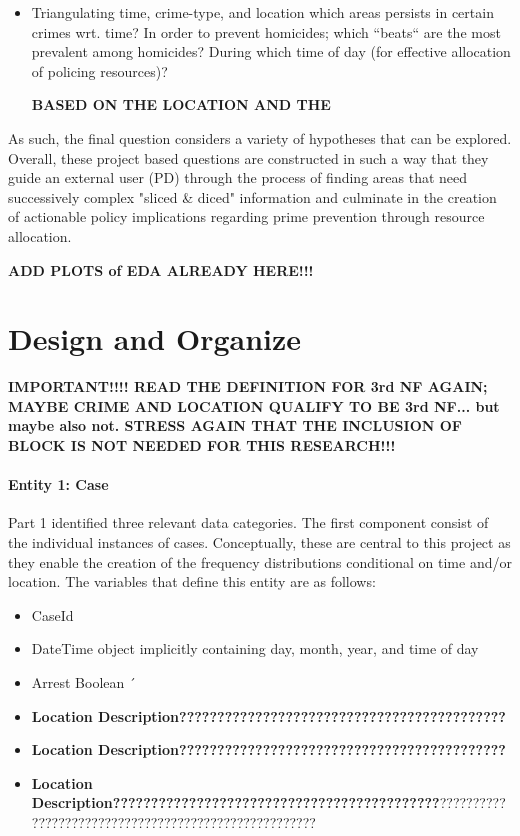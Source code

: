 \documentclass[a4paper]{article}
\begin{document}
\begin{itemize}
  \item Triangulating time, crime-type, and location which areas persists in certain crimes wrt. time?
In order to prevent homicides; which “beats“ are the most prevalent among homicides? During which time of day (for effective allocation of policing resources)? 

\textbf{BASED ON THE LOCATION AND THE }
\end{itemize}

As such, the final question considers a variety of hypotheses that can be explored. Overall, these project based questions are constructed in such a way that they guide an external user (PD) through the process of finding areas that need successively complex "sliced \& diced" information and culminate in the creation of actionable policy implications regarding prime prevention through resource allocation.


\textbf{ADD PLOTS of EDA ALREADY HERE!!!}


\section{Design and Organize}

\textbf{IMPORTANT!!!! READ THE DEFINITION FOR 3rd NF AGAIN; MAYBE CRIME AND LOCATION QUALIFY TO BE 3rd NF... but maybe also not. STRESS AGAIN THAT THE INCLUSION OF BLOCK IS NOT NEEDED FOR THIS RESEARCH!!!}

\paragraph{Entity 1: Case} Part 1 identified three relevant data categories.  The first component consist of the individual instances of cases. Conceptually, these are central to this project as they enable the creation of the frequency distributions conditional on time and/or location. The variables that define this entity are as follows:

\begin{itemize}
  \item CaseId
  \item DateTime object implicitly containing day, month, year, and time of day 
  \item Arrest Boolean  
´  \item \textbf{Location Description???????????????????????????????????????????}
\item \textbf{Location Description???????????????????????????????????????????}
\item \textbf{Location Description???????????????????????????????????????????}?????????????????????????????????????????????????????
\end{itemize}
 
\end{document}
